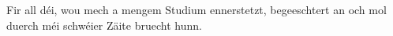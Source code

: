 \begin{dedica}
Fir all déi, wou mech a mengem Studium ennerstetzt, begeeschtert an och mol duerch méi schwéier Zäite bruecht hunn. 
\end{dedica}


\tableofcontents






\nocite{bezk-alkis}

\begingroup
\sloppy
\singlespacing
\printbibliography
\endgroup

\begingroup
\singlespacing

\endgroup
%
 

